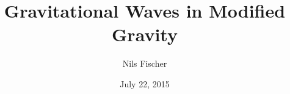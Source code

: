 \documentclass[12pt,oneside,parskip=half]{scrreprt}
\title{Gravitational Waves in Modified Gravity}
\author{Nils Fischer}
\date{July 22, 2015}
\begin{document}








\cleardoublepage

\tableofcontents

\listoffigures



\cleardoublepage{}











\cleardoublepage
\begin{appendices}





\end{appendices}


\printbibliography



\end{document}
